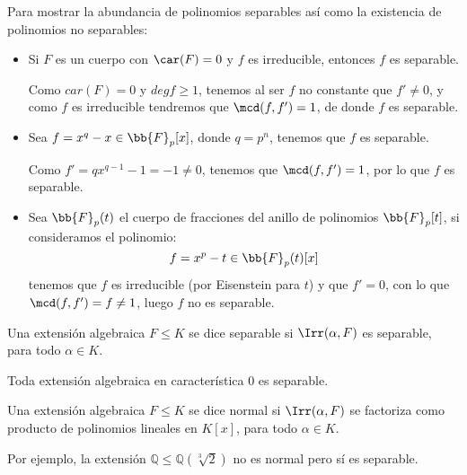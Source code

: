 \begin{ejemplo}
    Para mostrar la abundancia de polinomios separables así como la existencia de polinomios no separables:
    \begin{itemize}
        \item Si $F$ es un cuerpo con $\car(F)= 0$ y $f$ es irreducible, entonces $f$ es separable.

            Como $car(F)=0$ y $degf\geq 1$, tenemos al ser $f$ no constante que $f'\neq 0$, y como $f$ es irreducible tendremos que $\mcd(f,f')=1$, de donde $f$ es separable.
        \item Sea $f=x^q-x\in \bb{F}_p[x]$, donde $q=p^n$, tenemos que $f$ es separable.

            Como $f'=qx^{q-1}-1 = -1\neq 0$, tenemos que $\mcd(f,f')=1$, por lo que $f$ es separable.
        \item Sea $\bb{F}_p(t)$ el cuerpo de fracciones del anillo de polinomios $\bb{F}_p[t]$, si consideramos el polinomio:
            \begin{equation*}
                f = x^p-t\in \bb{F}_p(t)[x]
            \end{equation*}
            tenemos que $f$ es irreducible (por Eisenstein para $t$) y que $f'=0$, con lo que $\mcd(f,f')=f\neq 1$, luego $f$ no es separable.
    \end{itemize}
\end{ejemplo}

\begin{definicion}
    Una extensión algebraica $F\leq K$ se dice separable si $\Irr(\alpha,F)$ es separable, para todo $\alpha\in K$.
\end{definicion}

\begin{observacion}
    Toda extensión algebraica en característica $0$ es separable.
\end{observacion}

\begin{definicion}
    Una extensión algebraica $F\leq K$ se dice normal si $\Irr(\alpha,F)$ se factoriza como producto de polinomios lineales en $K[x]$, para todo $\alpha\in K$.
\end{definicion}

\begin{ejemplo}
    Por ejemplo, la extensión $\mathbb{Q}\leq \mathbb{Q}(\sqrt[3]{2})$ no es normal pero sí es separable.
\end{ejemplo}

